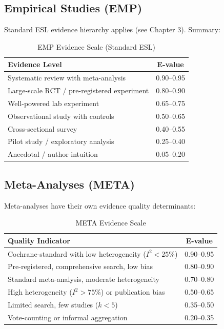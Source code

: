\documentclass[11pt,a4paper]{article}
\begin{document}
\subsection{Empirical Studies (EMP)}

Standard ESL evidence hierarchy applies (see Chapter 3). Summary:

\begin{table}[h]
\centering
\caption{EMP Evidence Scale (Standard ESL)}
\label{tab:emp-scale}
\begin{tabular}{lc}
\toprule
\textbf{Evidence Level} & \textbf{E-value} \\
\midrule
Systematic review with meta-analysis & 0.90--0.95 \\
Large-scale RCT / pre-registered experiment & 0.80--0.90 \\
Well-powered lab experiment & 0.65--0.75 \\
Observational study with controls & 0.50--0.65 \\
Cross-sectional survey & 0.40--0.55 \\
Pilot study / exploratory analysis & 0.25--0.40 \\
Anecdotal / author intuition & 0.05--0.20 \\
\bottomrule
\end{tabular}
\end{table}

\subsection{Meta-Analyses (META)}

Meta-analyses have their own evidence quality determinants:

\begin{table}[h]
\centering
\caption{META Evidence Scale}
\label{tab:meta-scale}
\begin{tabular}{lc}
\toprule
\textbf{Quality Indicator} & \textbf{E-value} \\
\midrule
Cochrane-standard with low heterogeneity ($I^2 < 25\%$) & 0.90--0.95 \\
Pre-registered, comprehensive search, low bias & 0.80--0.90 \\
Standard meta-analysis, moderate heterogeneity & 0.70--0.80 \\
High heterogeneity ($I^2 > 75\%$) or publication bias & 0.50--0.65 \\
Limited search, few studies ($k < 5$) & 0.35--0.50 \\
Vote-counting or informal aggregation & 0.20--0.35 \\
\bottomrule
\end{tabular}
\end{table}
\end{document}

